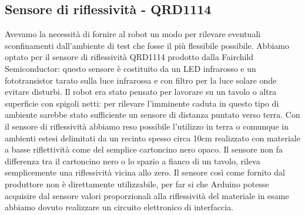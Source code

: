 \subsection{Sensore di riflessività - QRD1114}
Avevamo la necessità di fornire al robot un modo per rilevare eventuali 
sconfinamenti dall'ambiente di test che fosse il più flessibile possibile. 
Abbiamo optato per il sensore di riflessività QRD1114 prodotto dalla Fairchild 
Semiconductor: questo sensore è costituito da un LED infrarosso e un 
fototransistor tarato sulla luce infrarossa e con filtro per la luce solare 
onde evitare disturbi. Il robot era stato pensato per lavorare su un tavolo o 
altra superficie con spigoli netti: per rilevare l'imminente caduta in questo 
tipo di ambiente sarebbe stato sufficiente un sensore di distanza puntato 
verso terra. Con il sensore di riflessività abbiamo reso possibile l'utilizzo 
in terra o comunque in ambienti estesi delimitati da un recinto spesso circa 
10cm realizzato con materiale a basse riflettività come del semplice 
cartoncino nero opaco. Il sensore non fa differenza tra il cartoncino nero o 
lo spazio a fianco di un tavolo, rileva semplicemente una riflessività vicina 
allo zero. Il sensore così come fornito dal produttore non è direttamente 
utilizzabile, per far si che Arduino potesse acquisire dal sensore valori 
proporzionali alla riflessività del materiale in esame abbiamo dovuto 
realizzare un circuito elettronico di interfaccia. 
